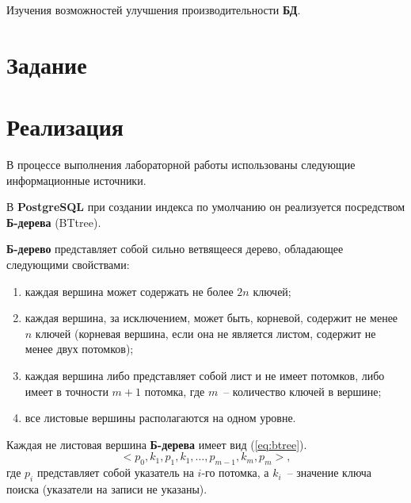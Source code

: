 \documentclass[14pt]{extarticle}
\makeatletter
\newcounter{sectionc}%
\newcommand{\numbersections}{\renewcommand{\Hy@numberline}[1]{##1~}}
\newcommand{\nonumbersections}{\renewcommand{\Hy@numberline}[1]{}}
\let\oldsection\section
\renewcommand{\section}{\numbersections\oldsection}
\let\oldsectionc\sectionc
\renewcommand{\sectionc}{\nonumbersections\oldsectionc}
\makeatother
\begin{document}
Изучения возможностей улучшения производительности \textbf{БД}.

\section{Задание}


\section{Реализация}

В процессе выполнения лабораторной работы использованы следующие информационные источники\cite{docpsql, nikov2020, rogov2020, morguniv2018}.


В \textbf{PostgreSQL} при создании индекса по умолчанию он реализуется посредством \textbf{Б-дерева} (BTtree).


\textbf{Б-дерево} представляет собой сильно ветвящееся дерево, обладающее следующими свойствами:
\begin{enumerate}[label=--]%
	\item каждая вершина может содержать не более $2n$ ключей;
	\item каждая вершина, за исключением, может быть, корневой, содержит не менее $n$ ключей (корневая вершина, если она не является листом, содержит не менее двух потомков);
	\item каждая вершина либо представляет собой лист и не имеет потомков, либо имеет в точности $m + 1$ потомка, где $m$~-- количество ключей в вершине;
	\item все листовые вершины располагаются на одном уровне. 
\end{enumerate}

Каждая не листовая вершина \textbf{Б-дерева} имеет вид (\ref{eq:btree}).%
\begin{equation}%
<p_0, k_1, p_1, k_1, \ldots, p_{m-1}, k_m, p_m>,
\label{eq:btree}
\end{equation}
где $p_i$ представляет собой указатель на $i$-го потомка, а $k_i$~-- значение ключа поиска (указатели на записи не указаны).
\end{document}
